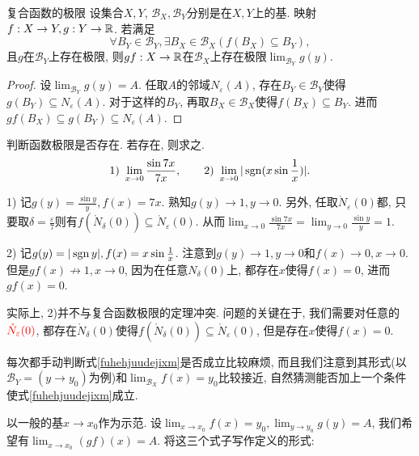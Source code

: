 \begin{theorem}{复合函数的极限}
	设集合$X,Y$, $\mathcal{B}_X, \mathcal{B}_Y$分别是在$X,Y$上的基. 映射$f:X \to Y, g:Y \to \mathbb{R}$. 若满足
	\begin{equation}
		\forall B_Y \in \mathcal{B}_Y, \exists B_X \in \mathcal{B}_X (f(B_X) \subseteq B_Y),\label{fuhehjuudejixm}
	\end{equation}
	且$g$在$\mathcal{B}_Y$上存在极限, 则$gf:X \to \mathbb{R}$在$\mathcal{B}_X$上存在极限$\lim_{\mathcal{B}_Y} g(y)$. 
\end{theorem}
\begin{proof}
	设$\lim_{\mathcal{B}_Y} g(y)=A$. 任取$A$的邻域$N_{\varepsilon} (A)$, 存在$B_Y \in \mathcal{B}_Y$使得$g(B_Y) \subseteq N_{\varepsilon} (A)$. 对于这样的$B_Y$, 再取$B_X \in \mathcal{B}_X$使得$f(B_X) \subseteq B_Y$. 进而$gf(B_X) \subseteq g(B_Y) \subseteq N_{\varepsilon} (A)$. 
\end{proof}

\begin{example}
	判断函数极限是否存在. 若存在, 则求之. $$1)~\lim_{x\to 0} \frac{\sin 7x}{7x}, \qquad 2)~\lim_{x \to 0} |\operatorname{sgn} (x\sin \frac{1}{x})|.$$
\end{example}
\begin{solution}
	1) 记$g(y)=\frac{\sin y}{y}, f(x)=7x$. 熟知$g(y) \to 1, y \to 0$. 另外, 任取$\mathring{N}_{\varepsilon}(0)$都, 只要取$\delta = \frac{\varepsilon}{7}$则有$f(\mathring{N}_{\delta}(0)) \subseteq \mathring{N}_{\varepsilon}(0)$. 从而$\lim_{x\to 0} \frac{\sin 7x}{7x} = \lim_{y\to 0} \frac{\sin y}{y} = 1$. 
	
	2) 记$g(y) = |\operatorname{sgn} y|, f(x) = x\sin \frac{1}{x}$. 注意到$g(y) \to 1, y \to 0$和$f(x) \to 0, x \to 0$. 但是$gf(x) \nrightarrow 1, x \to 0$, 因为在任意$N_{\delta} (0)$上, 都存在$x$使得$f(x)=0$, 进而$gf(x)=0$. 
\end{solution}
\begin{remark}
	实际上, 2)并不与复合函数极限的定理冲突. 问题的关键在于, 我们需要对任意的$\color{red} \mathring{N}_{\varepsilon} (0)$, 都存在$\mathring{N}_{\delta} (0)$使得$f(\mathring{N}_{\delta} (0)) \subseteq \mathring{N}_{\varepsilon} (0)$, 但是存在$x$使得$f(x)=0$. 
\end{remark}

每次都手动判断式\ref{fuhehjuudejixm}是否成立比较麻烦, 而且我们注意到其形式(以$\mathcal{B}_Y = (y \to y_0)$为例)和$\lim_{\mathcal{B}_X} f(x) = y_0$比较接近, 自然猜测能否加上一个条件使式\ref{fuhehjuudejixm}成立. 

以一般的基$x\to x_0$作为示范. 设$\lim_{x \to x_0} f(x) = y_0, \lim_{y \to y_0} g(y) = A$, 我们希望有$\lim_{x \to x_0} (gf)(x) = A$. 将这三个式子写作定义的形式: 

